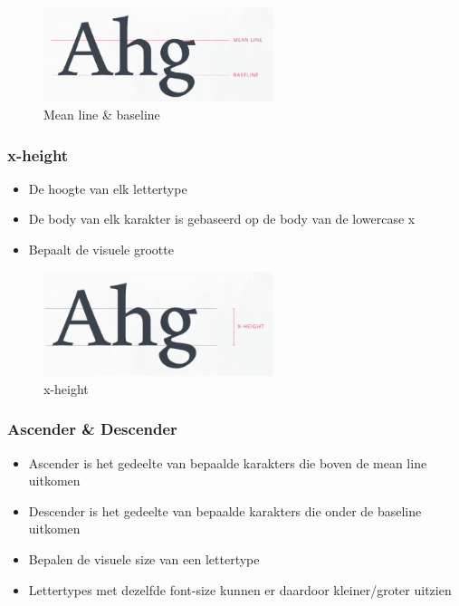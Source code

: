 \documentclass{article}
\begin{document}
\begin{figure}[H]
    \includegraphics[width=0.6\textwidth]{img/Screenshot_20200224_090818.png}
    \caption{Mean line \& baseline}
\end{figure}

\subsubsection{x-height}
\begin{itemize}
    \item De hoogte van elk lettertype
    \item De body van elk karakter is gebaseerd op de body van de lowercase x
    \item Bepaalt de visuele grootte
\end{itemize}

\begin{figure}[H]
    \includegraphics[width=0.6\textwidth]{img/Screenshot_20200224_091023.png}
    \caption{x-height}
\end{figure}

\subsubsection{Ascender \& Descender}

\begin{itemize}
    \item Ascender is het gedeelte van bepaalde karakters die boven de mean line uitkomen
    \item Descender is het gedeelte van bepaalde karakters die onder de baseline uitkomen
    \item Bepalen de visuele size van een lettertype
    \item Lettertypes met dezelfde font-size kunnen er daardoor kleiner/groter uitzien
\end{itemize}
\end{document}
